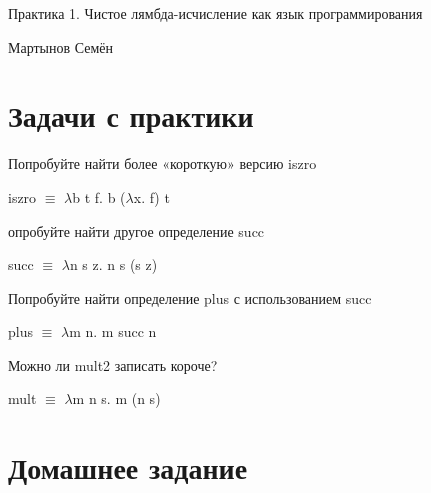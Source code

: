 \documentclass[a4paper,12pt]{article} %
\begin{document}
\begin{flushright}
Практика 1. Чистое лямбда-исчисление как язык программирования

Мартынов Семён

\hrulefill
\end{flushright}

\section{Задачи с практики}

\begin{enumerate}
{\item Попробуйте найти более «короткую» версию iszro}

iszro $\equiv$ $\lambda$b t f. b ($\lambda$x. f) t

{\item опробуйте найти другое определение succ}

succ $\equiv$ $\lambda$n s z. n s (s z)

{\item Попробуйте найти определение plus с использованием succ}

plus $\equiv$ $\lambda$m n. m succ n

{\item Можно ли mult2 записать короче?}

mult $\equiv$ $\lambda$m n s. m (n s)

\end{enumerate}

\section{Домашнее задание}
\end{document}
